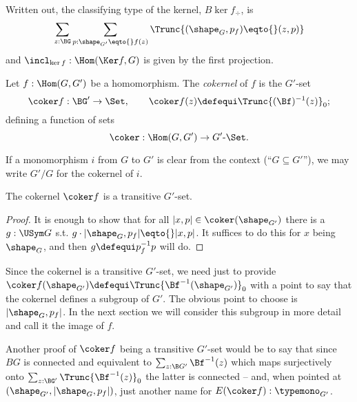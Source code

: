 Written out, the classifying type of the kernel,
$B\ker f_\div$, is $$\sum_{z:\BG}\sum_{p:\shape_{G'}\eqto{}f(z)}\Trunc{(\shape_G,p_f)\eqto{}(z,p)}$$
and $\incl_{\ker f}:\Hom(\Ker f, G)$ is given by the first projection.

\begin{definition}
  \label{def:cokernel}
  Let $f:\Hom(G,G')$  be a homomorphism.
The \emph{cokernel} of $f$ is the $G'$-set
\[
  \coker f:\BG'\to\Set,\qquad \coker f(z)\defequi  \Trunc{(\Bf)^{-1}(z)}_0;
\]
defining a function of sets
$$\coker:\Hom(G,G')\to G'\text{-}\Set.$$
\end{definition}

If a monomorphism $i$ from $G$ to $G'$ is clear from the context (``$G\subseteq G'$''), we may write $G'/G$ for the cokernel of $i$.
\begin{lemma}
  \label{lem:coker is transitive}
  The cokernel $\coker f$ is a transitive $G'$-set.
\end{lemma}
\begin{proof}
  It is enough to show that for all $|x,p|\in\coker(\shape_{G'})$ there is a $g:\USym G$ s.t. $g\cdot |\shape_G,p_f|\eqto{} |x,p|$.  It suffices to do this for $x$ being $\shape_G$, and then $g\defequi p_f^{-1}p$ will do.
\end{proof}
\begin{remark}
  \label{remark:imageandcokernel}
  Since the cokernel is a transitive $G'$-set, we need just to provide $\coker f(\shape_{G'})\defequi\Trunc{\Bf^{-1}(\shape_{G'})}_0$ with a point to say that the cokernel defines a subgroup of $G'$. The obvious point to choose is $|\shape_G,p_f|$. In the next section we will consider this subgroup in more detail and call it the image of $f$.

Another proof of $\coker f$ being a transitive $G'$-set would be to say that since $BG$ is connected and equivalent to $\sum_{z:\B G'}\Bf^{-1}(z)$ which maps surjectively onto $\sum_{z:\BG'}\Trunc{\Bf^{-1}(z)}_0$ the latter is connected -- and, when pointed at $(\shape_{G'},|\shape_G,p_f|)$, just another name for $E(\coker f):\typemono_{G'}$.
\end{remark}


